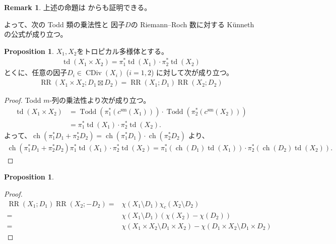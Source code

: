 \documentclass[a4paper,dvipdfmx,reqno,12pt]{amsart}
\theoremstyle{definition}
\newtheorem{proposition}[theorem]{Proposition}
\newtheorem{remark}[theorem]{Remark}
\newcommand{\opn}[1]{\operatorname{#1}}
\numberwithin{equation}{section}
\begin{document}
\begin{remark}上述の命題は
\cite[Proposition 5.1]{demedrano2023chern}
からも証明できる。
\end{remark}

よって、次の Todd 類の乗法性と
因子$D$の Riemann--Roch 数に対する
 K\"unneth の公式が成り立つ。

\begin{proposition}
$X_1,X_2$をトロピカル多様体とする。
\begin{align}
\opn{td}(X_1\times X_2)=\pi_{1}^{*}\opn{td}(X_1)\cdot 
\pi_{2}^{*}\opn{td}(X_2)
\end{align}
とくに、任意の因子$D_i\in \opn{CDiv}(X_i)$ ($i=1,2$)
に対して次が成り立つ。
\begin{align}
\opn{RR}(X_1\times X_2;D_1\boxtimes D_2)
=\opn{RR}(X_1;D_1)\opn{RR}(X_2;D_2)
\end{align}

\end{proposition}

\begin{proof}
Todd $m$-列の乗法性より次が成り立つ。
\begin{align}
\opn{td}(X_1\times X_2)
&=\opn{Todd}(\pi^{*}_1(c^{\mathrm{sm}}(X_1)))
\cdot \opn{Todd}(\pi^{*}_2(c^{\mathrm{sm}}(X_2))) \\
&=\pi^{*}_1\opn{td}(X_1)\cdot 
\pi^{*}_2\opn{td}(X_2).
\end{align}
よって、$\opn{ch}(\pi_1^{*}D_1+\pi_2^{*}D_2)=
\opn{ch}(\pi_1^{*}D_1)\cdot \opn{ch}(\pi_2^{*}D_2)$
より、
\begin{align}
\opn{ch}(\pi_1^{*}D_1+\pi_2^{*}D_2)
\pi^{*}_1\opn{td}(X_1)\cdot 
\pi^{*}_2\opn{td}(X_2)=
\pi_1^{*}(\opn{ch}(D_1)\opn{td}(X_1))\cdot
\pi_2^{*}(\opn{ch}(D_2)\opn{td}(X_2)).
\end{align}

\end{proof}

\begin{proposition}

\end{proposition}
\begin{proof}

\begin{align}
\opn{RR}(X_1;D_1)
\opn{RR}(X_2;-D_2)
= &\chi(X_1\setminus D_1)\chi_c(X_2\setminus D_2) \\
= &\chi(X_1\setminus D_1)
(\chi(X_2)-\chi(D_2)) \\
= &\chi(X_1\times X_2\setminus D_1\times X_2)
-\chi(D_1\times X_2\setminus D_1\times D_2)
\end{align}

\end{proof}
\end{document}
